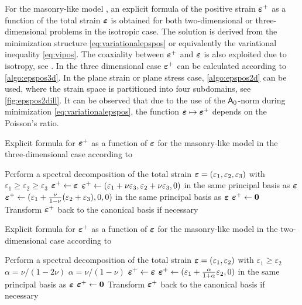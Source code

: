 For the masonry-like model \cite{FreddiRoyer-Carfagni:2010}, an explicit formula of the positive strain $\eps^+$ as a function of the total strain $\eps$ is obtained for both two-dimensional or three-dimensional problems in the isotropic case. The solution is derived from the minimization structure \eqref{eq:variationalepspos} or equivalently the variational inequality \eqref{eq:vipos}. The coaxiality between $\eps^+$ and $\eps$ is also exploited due to isotropy, see \cite{Del:1989,AlfanoRosatiValoroso:2000}. In the three dimensional case $\eps^+$ can be calculated according to \cref{algo:epspos3d}. In the plane strain or plane stress case, \cref{algo:epspos2d} can be used, where the strain space is partitioned into four subdomains, see \cref{fig:epspos2dill}. It can be observed that due to the use of the $\mathsf{A}_0$-norm during minimization \eqref{eq:variationalepspos}, the function $\eps\mapsto\eps^+$ depends on the Poisson's ratio.
\begin{algorithm}[htbp]
\caption{Explicit formula for $\eps^+$ as a function of $\eps$ for the masonry-like model \cite{FreddiRoyer-Carfagni:2010} in the three-dimensional case according to \cite{Sacco:1990}} \label{algo:epspos3d}
\begin{algorithmic}[1]
\State Perform a spectral decomposition of the total strain $\eps=(\varepsilon_1,\varepsilon_2,\varepsilon_3)$ with $\varepsilon_1\geq\varepsilon_2\geq\varepsilon_3$
  \State $\eps^+\gets\eps$
  \State $\eps^+\gets(\varepsilon_1+\nu\varepsilon_3,\varepsilon_2+\nu\varepsilon_3,0)$ in the same principal basis as $\eps$
  \State $\eps^+\gets(\varepsilon_1+\frac{\nu}{1-\nu}(\varepsilon_2+\varepsilon_3),0,0)$ in the same principal basis as $\eps$
\Else
  \State $\eps^+\gets\vec{0}$
\EndIf
\State Transform $\eps^+$ back to the canonical basis if necessary
\end{algorithmic}
\end{algorithm}
\begin{algorithm}[htbp]
\caption{Explicit formula for $\eps^+$ as a function of $\eps$ for the masonry-like model \cite{FreddiRoyer-Carfagni:2010} in the two-dimensional case according to \cite{AlfanoRosatiValoroso:2000}} \label{algo:epspos2d}
\begin{algorithmic}[1]
\State Perform a spectral decomposition of the total strain $\eps=(\varepsilon_1,\varepsilon_2)$ with $\varepsilon_1\geq\varepsilon_2$
  \State $\alpha=\nu/(1-2\nu)$
\Else
  \State $\alpha=\nu/(1-\nu)$
\EndIf
{}
  \State $\eps^+\gets\eps$
  \State $\eps^+\gets(\varepsilon_1+\frac{\alpha}{1+\alpha}\varepsilon_2,0)$ in the same principal basis as $\eps$
\Else
  \State $\eps^+\gets\vec{0}$
\EndIf
\State Transform $\eps^+$ back to the canonical basis if necessary
\end{algorithmic}
\end{algorithm}
